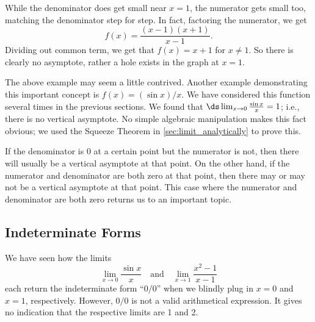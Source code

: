 
While the denominator does get small near $x=1$, the numerator gets small too, matching the denominator step for step. In fact, factoring the numerator, we get\vspace{-.5\baselineskip}
\[f(x)=\frac{(x-1)(x+1)}{x-1}.\]
Dividing out common term, we get that $f(x)=x+1$ for $x\not=1$.   So there is clearly no asymptote, rather a hole exists in the graph at $x=1$.\bigskip

The above example may seem a little contrived.  Another example demonstrating this important concept is $f(x)= (\sin x)/x$. We have considered this function several times in the previous sections. We found that $\ds \lim_{x\to0}\frac{\sin x}{x}=1$; i.e., there is no vertical asymptote. No simple algebraic manipulation makes this fact obvious; we used the Squeeze Theorem in \autoref{sec:limit_analytically} to prove this.\bigskip

If the denominator is 0 at a certain point but the numerator is not, then there will usually be a vertical asymptote at that point. On the other hand, if the numerator and denominator are both zero at that point, then there may or may not be a vertical asymptote at that point.  This case where the numerator and denominator are both zero returns us to an important topic.

\subsection{Indeterminate Forms}

We have seen how the limits 
\[\lim_{x\rightarrow 0}\frac{\sin x}{x}\quad \text{and}\quad \lim_{x\to1}\frac{x^2-1}{x-1}\]
each return the indeterminate form ``$0/0$'' when we blindly plug in $x=0$ and $x=1$, respectively. However, $0/0$ is not a valid arithmetical expression. It gives no indication that the respective limits are 1 and 2.%

